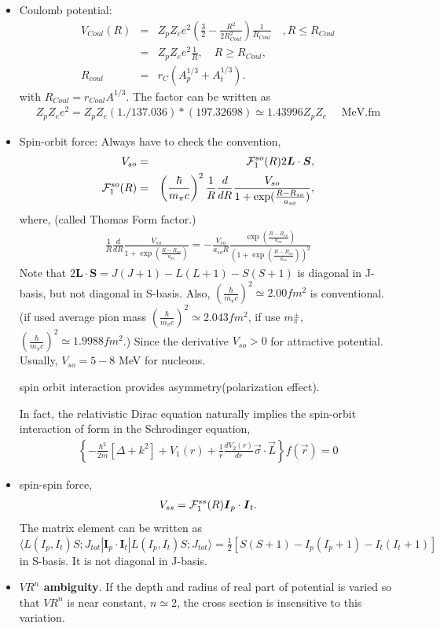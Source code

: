 \documentclass[11pt]{book}
\def\bm{\boldsymbol}
\def\la{\langle}
\def\ra{\rangle}
\newcommand{\bea}{\begin{eqnarray}}
\newcommand{\eea}{\end{eqnarray}}
\newcommand{\no}{\nonumber \\}
\begin{document}
\begin{itemize}
 
\item Coulomb potential:
\bea 
V_{Coul}(R)&=& Z_p Z_e e^2(\frac{3}{2}-\frac{R^2}{2R_{Coul}^2}) \frac{1}{R_{Coul}} 
   \quad , R\leq R_{Coul}
\no  
    &=& Z_p Z_e e^2\frac{1}{R},\quad R\geq R_{Coul},\no 
R_{coul}&=& r_C(A_p^{1/3}+A_t^{1/3}).    
\eea  
with $R_{Coul}=r_{Coul}A^{1/3}$.
The factor can be written as
\bea 
Z_p Z_e e^2 =Z_p Z_e (1./137.036)*(197.32698)\simeq 1.43996 Z_p Z_e \quad \mbox{ MeV.fm}
\eea 

\item Spin-orbit force: Always have to check the convention,
\bea 
V_{so}&=&{\cal F}_1^{so}(R) 2{\bm L}\cdot{\bm S}, \no 
{\cal F}_1^{so}(R)&=&\left(\frac{\hbar}{m_\pi c}\right)^2
                \frac{1}{R}\frac{d}{dR} 
                \frac{V_{so}}
                {1+\exp( \frac{R-R_{so}}{a_{so}} )},
\eea 
where, (called Thomas Form factor.)
\bea 
\frac{1}{R}\frac{d}{dR} 
                \frac{V_{so}}
                {1+\exp( \frac{R-R_{so}}{a_{so}} )}
                =-\frac{V_{so}}{a_{so} R}\frac{\exp( \frac{R-R_{so}}{a_{so}} )}
                {\left(1+\exp( \frac{R-R_{so}}{a_{so}} ) \right)^2 }                 
\eea 
Note that $2{\bm L}\cdot{\bm S}=J(J+1)-L(L+1)-S(S+1)$ is diagonal in J-basis, but not diagonal in S-basis. 
Also, 
$\left(\frac{\hbar}{m_\pi c}\right)^2\simeq 2.00 fm^2 $  is conventional.
(if used average pion mass $\left(\frac{\hbar}{m_\pi c}\right)^2\simeq 2.043 fm^2 $,
if use $m_\pi^{\pm}$,$\left(\frac{\hbar}{m_\pi c}\right)^2\simeq 1.9988 fm^2 $.)
Since the derivative $V_{so}>0$ for attractive potential. Usually, $V_{so}=5-8$ MeV for nucleons. 

spin orbit interaction provides asymmetry(polarization effect).  

In fact, the relativistic Dirac equation naturally implies the spin-orbit interaction 
of form in the Schrodinger equation,
\bea 
\left\{ -\frac{\hbar^2}{2m}[\Delta+k^2]+V_1(r)+\frac{1}{r}\frac{d V_2(r)}{dr} {\vec{\sigma}}\cdot{\vec L} \right\} f({\vec r})=0
\eea 

\item spin-spin force,
   \bea 
   V_{ss} = {\cal F}^{ss}_1(R) {\bm I}_p\cdot{\bm I}_t .
   \eea 
   The matrix element can be written as 
   $\la L(I_p,I_t)S;J_{tot}|{\bm I}_p\cdot{\bm I}_t|L(I_p,I_t)S;J_{tot}\ra 
    =\frac{1}{2}[S(S+1)-I_p(I_p+1)-I_t(I_t+1)]$ in S-basis. It is not diagonal in J-basis. 
    
\item {\bf $VR^n$ ambiguity}. If the depth and radius of real part of potential
 is varied so that  $VR^n$ is near constant, $n\simeq 2$, the cross section 
 is insensitive to this variation. 
 

\end{itemize}
\end{document}
